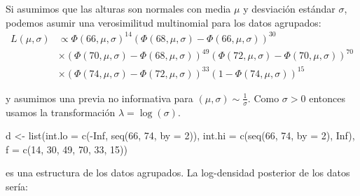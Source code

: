 \documentclass[
  12pt,
]{book}
\newenvironment{Shaded}{\begin{snugshade}}{\end{snugshade}}
\newcommand{\AttributeTok}[1]{\textcolor[rgb]{0.77,0.63,0.00}{#1}}
\newcommand{\ConstantTok}[1]{\textcolor[rgb]{0.00,0.00,0.00}{#1}}
\newcommand{\ControlFlowTok}[1]{\textcolor[rgb]{0.13,0.29,0.53}{\textbf{#1}}}
\newcommand{\DecValTok}[1]{\textcolor[rgb]{0.00,0.00,0.81}{#1}}
\newcommand{\FunctionTok}[1]{\textcolor[rgb]{0.00,0.00,0.00}{#1}}
\newcommand{\NormalTok}[1]{#1}
\newcommand{\OtherTok}[1]{\textcolor[rgb]{0.56,0.35,0.01}{#1}}
\newcommand{\SpecialCharTok}[1]{\textcolor[rgb]{0.00,0.00,0.00}{#1}}
\begin{document}
Si asumimos que las alturas son normales con media \(\mu\) y desviación
estándar \(\sigma\), podemos asumir una verosimilitud multinomial para
los datos agrupados: \begin{align*}
L(\mu,\sigma)&\propto \Phi(66,\mu,\sigma)^{14}(\Phi(68,\mu,\sigma)-\Phi(66,\mu,\sigma))^{30} \\
&\times  (\Phi(70,\mu,\sigma)-\Phi(68,\mu,\sigma))^{49} (\Phi(72,\mu,\sigma)-\Phi(70,\mu,\sigma))^{70}\\
&\times  (\Phi(74,\mu,\sigma)-\Phi(72,\mu,\sigma))^{33} (1-\Phi(74,\mu,\sigma))^{15}
\end{align*}

y asumimos una previa no informativa para
\((\mu,\sigma)\sim \frac 1 \sigma\). Como \(\sigma>0\) entonces usamos
la transformación \(\lambda=\log (\sigma)\).

\begin{Shaded}
\begin{Highlighting}[]
\NormalTok{d }\OtherTok{\textless{}{-}} \FunctionTok{list}\NormalTok{(}\AttributeTok{int.lo =} \FunctionTok{c}\NormalTok{(}\SpecialCharTok{{-}}\ConstantTok{Inf}\NormalTok{, }\FunctionTok{seq}\NormalTok{(}\DecValTok{66}\NormalTok{, }\DecValTok{74}\NormalTok{, }\AttributeTok{by =} \DecValTok{2}\NormalTok{)), }\AttributeTok{int.hi =} \FunctionTok{c}\NormalTok{(}\FunctionTok{seq}\NormalTok{(}\DecValTok{66}\NormalTok{,}
    \DecValTok{74}\NormalTok{, }\AttributeTok{by =} \DecValTok{2}\NormalTok{), }\ConstantTok{Inf}\NormalTok{), }\AttributeTok{f =} \FunctionTok{c}\NormalTok{(}\DecValTok{14}\NormalTok{, }\DecValTok{30}\NormalTok{, }\DecValTok{49}\NormalTok{, }\DecValTok{70}\NormalTok{, }\DecValTok{33}\NormalTok{, }\DecValTok{15}\NormalTok{))}
\end{Highlighting}
\end{Shaded}

es una estructura de los datos agrupados. La log-densidad posterior de
los datos sería:

\begin{Shaded}
\end{Shaded}
\end{document}
